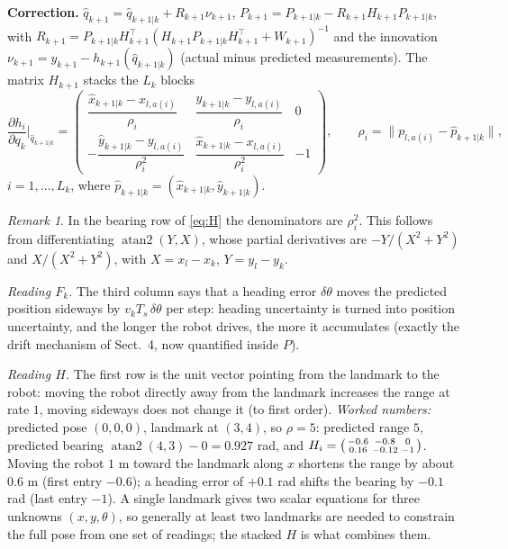 \documentclass[11pt,a4paper]{article}
\def\boldsymbol#1{#1}%
\def\mathbf#1{#1}%
\DeclareMathOperator{\atantwo}{atan2}
\newcommand{\tp}{^{\top}}
\newcommand{\Ts}{T_s}
\newcommand{\hq}{\hat{\boldsymbol{q}}}
\newcommand{\bq}{\boldsymbol{q}}
\newcommand{\by}{\boldsymbol{y}}
\newcommand{\bnu}{\boldsymbol{\nu}}
\newcommand{\mF}{\mathbf{F}}
\newcommand{\mH}{\mathbf{H}}
\newcommand{\mP}{\mathbf{P}}
\newcommand{\mR}{\mathbf{R}}
\newcommand{\mW}{\mathbf{W}}
\theoremstyle{definition}
\theoremstyle{plain}
\theoremstyle{remark}
\newtheorem*{remark}{Remark}
\begin{document}
\noindent\textbf{Correction.} $\hq_{k+1}=\hq_{k+1|k}+\mR_{k+1}\bnu_{k+1}$, $\mP_{k+1}=\mP_{k+1|k}-\mR_{k+1}\mH_{k+1}\mP_{k+1|k}$, with
$\mR_{k+1}=\mP_{k+1|k}\mH_{k+1}\tp(\mH_{k+1}\mP_{k+1|k}\mH_{k+1}\tp+\mW_{k+1})^{-1}$ and the innovation
$\bnu_{k+1}=\by_{k+1}-\boldsymbol h_{k+1}(\hq_{k+1|k})$ (actual minus predicted measurements). The matrix $\mH_{k+1}$ stacks the $L_k$ blocks
\begin{equation}\label{eq:H}
\frac{\partial\boldsymbol h_i}{\partial\bq_k}\Big|_{\hq_{k+1|k}}=
\begin{pmatrix}
\dfrac{\hat x_{k+1|k}-x_{l,a(i)}}{\rho_i} & \dfrac{\hat y_{k+1|k}-y_{l,a(i)}}{\rho_i} & 0\\[8pt]
-\dfrac{\hat y_{k+1|k}-y_{l,a(i)}}{\rho_i^2} & \dfrac{\hat x_{k+1|k}-x_{l,a(i)}}{\rho_i^2} & -1
\end{pmatrix},\qquad \rho_i=\|\boldsymbol p_{l,a(i)}-\hat{\boldsymbol p}_{k+1|k}\|,
\end{equation}
$i=1,\dots,L_k$, where $\hat{\boldsymbol p}_{k+1|k}=(\hat x_{k+1|k},\hat y_{k+1|k})$.

\begin{remark}
In the bearing row of \eqref{eq:H} the denominators are $\rho_i^2$. This follows from differentiating $\atantwo(Y,X)$, whose partial derivatives are
$-Y/(X^2+Y^2)$ and $X/(X^2+Y^2)$, with $X=x_{l}-x_k$, $Y=y_{l}-y_k$.
\end{remark}

\begin{intuition}
\emph{Reading $\mF_k$.} The third column says that a heading error $\delta\theta$ moves the predicted position sideways by
$v_k\Ts\,\delta\theta$ per step: heading uncertainty is turned into position uncertainty, and the longer the robot drives, the more
it accumulates (exactly the drift mechanism of Sect.~4, now quantified inside $\mP$).

\emph{Reading $\mH$.} The first row is the unit vector pointing from the landmark to the robot: moving the robot directly away from the landmark increases the range
at rate $1$, moving sideways does not change it (to first order). \emph{Worked numbers:} predicted pose $(0,0,0)$, landmark at $(3,4)$, so $\rho=5$:
predicted range $5$, predicted bearing $\atantwo(4,3)-0=0.927$ rad, and
$\mH_i=\begin{psmallmatrix}-0.6&-0.8&0\\0.16&-0.12&-1\end{psmallmatrix}$. Moving the robot $1$ m toward the landmark along $x$ shortens the range by about $0.6$ m
(first entry $-0.6$); a heading error of $+0.1$ rad shifts the bearing by $-0.1$ rad (last entry $-1$).
A single landmark gives two scalar equations for three unknowns $(x,y,\theta)$, so generally at least two landmarks are needed to constrain the full pose from one set of readings;
the stacked $\mH$ is what combines them.
\end{intuition}
\end{document}
